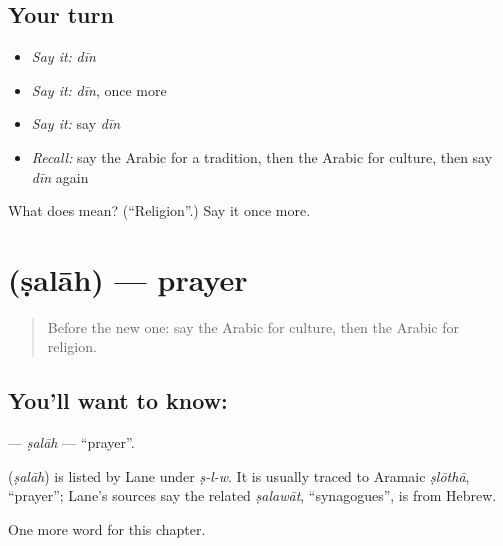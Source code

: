 \subsection*{Your turn}
\begin{itemize}
\raggedright
  \item \emph{Say it:} \emph{dīn}
  \item \emph{Say it:} \emph{dīn}, once more
  \item \emph{Say it:} say \emph{dīn}
  \item \emph{Recall:} say the Arabic for a tradition, then the Arabic for culture, then say \emph{dīn} again
\end{itemize}

\begin{tcolorbox}[breakable,colback=teal!4,colframe=teal!35!black,title={Before you move on}]
What does  mean? (\textquotedblleft{}Religion\textquotedblright{}.) Say it once more.
\end{tcolorbox}
\section[\texorpdfstring{\ar{صلاة} (ṣalāh)}{صلاة (ṣalāh)}]{ (ṣalāh) — prayer}

\label{lesson:AR-C267-salah}



\begin{quote}
Before the new one: say the Arabic for culture, then the Arabic for religion.
\end{quote}

\subsection*{You'll want to know: }
\textbf{} — \emph{ṣalāh} — \textquotedblleft{}prayer\textquotedblright{}.

\begin{cousinweb}
\textbf{} (\emph{ṣalāh}) is listed by Lane under \emph{ṣ-l-w}. It is usually traced to Aramaic \emph{ṣlōthā}, \textquotedblleft{}prayer\textquotedblright{}; Lane's sources say the related \emph{ṣalawāt}, \textquotedblleft{}synagogues\textquotedblright{}, is from Hebrew.
\end{cousinweb}

\begin{grammarlens}[title={What you've built}]
One more word for this chapter.
\end{grammarlens}

